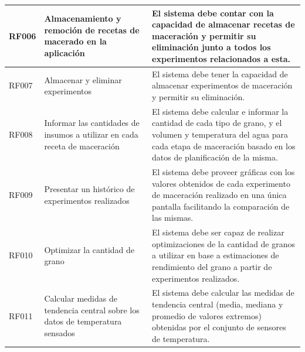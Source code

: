\begin{longtable}[H]{|p{1.4cm}|p{3.1cm}|p{9.5cm}|}
        RF006 & Almacenamiento y remoción de recetas de macerado en la aplicación & El sistema debe contar con la capacidad de almacenar recetas de maceración y permitir su eliminación junto a  todos los experimentos relacionados a esta.
        \\\hline
        
        RF007 & Almacenar y eliminar experimentos  & El sistema debe tener la capacidad de almacenar experimentos de maceración y permitir su eliminación.
        \\\hline
        
        RF008 & Informar las cantidades de insumos a utilizar en cada receta de maceración & El sistema debe calcular e informar la cantidad de cada tipo de grano, y el volumen y temperatura del agua para cada etapa de maceración basado en los datos de planificación de la misma.
        \\\hline
        
        RF009 & Presentar un histórico de experimentos realizados & El sistema debe proveer gráficas con los valores obtenidos de cada experimento de maceración realizado en una única pantalla facilitando la comparación de las mismas.
        \\\hline
        
        RF010 & Optimizar la cantidad de grano & El sistema debe ser capaz de realizar optimizaciones de la cantidad de granos a utilizar en base a estimaciones de rendimiento del grano a partir de experimentos realizados.
         \\\hline
        RF011 & Calcular medidas de tendencia central sobre los datos de temperatura sensados & El sistema debe calcular las medidas de tendencia central (media, mediana y promedio de valores extremos) obtenidas por el conjunto de sensores de temperatura.
        \\\hline
 \end{longtable}
   
    
 
 
 
